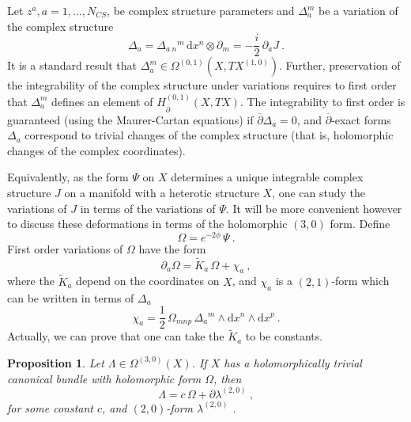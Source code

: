 \documentclass[12pt,a4paper]{article}
\newcommand{\half}{\frac{1}{2}}
\def\bar#1{\overline{#1}}
\let\p=\partial
\def\d{\textrm{d}}
\def\bp{\bar{\partial}}
\newtheorem{Proposition}{Proposition}
\theoremstyle{definition}
\begin{document}
Let $z^a, a = 1,\ldots, N_{CS}$, be complex structure parameters and $\Delta_a^m$ be a variation of the complex structure
\[ \Delta_a  = \Delta_a{}_{\, n}{}^m\, \d x^n\otimes \partial_m = - \frac{i}{2}\, \partial_aJ~.\]
It is a standard result that $\Delta_a^m\in \Omega^{(0,1)}(X, TX^{(1,0)})$. 
Further, preservation of the integrability of the complex structure under variations requires to first order that $\Delta_a^m$ defines an element of $H^{(0,1)}_{\bar\partial}(X,TX)$.  The integrability to first order is guaranteed (using the Maurer-Cartan equations) if $\bp\Delta_a = 0$, and $\bp$-exact forms $\Delta_a$ correspond to trivial changes of the complex structure (that is, holomorphic changes of the complex coordinates). 

Equivalently, as the form $\Psi$ on $X$ determines a unique integrable complex structure $J$ on a manifold with a heterotic structure $X$, one can study the  variations of $J$ in terms of the variations of $\Psi$. It will be more convenient however to discuss these deformations in terms of the holomorphic $(3,0)$ form.  Define
\[ \Omega = e^{-2\phi}\, \Psi~.\]
First order variations of $\Omega$ have the form~\citep{MR0112154, 0128.16902} 
\begin{equation} 
\partial_a \Omega = \widetilde K_a\, \Omega + \chi_a~,\label{eq:prevarO}
\end{equation}
where the $\widetilde K_a$ depend on the coordinates on $X$, and $\chi_a$ is a $(2,1)$-form which can be written in terms of $\Delta_a$
\begin{equation}
\chi_a = \half\, \Omega_{mnp}\, \Delta_a{}^m\wedge\d x^n\wedge\d x^p~.\label{eq:chi}
\end{equation}
Actually, we can prove that one can take the $\widetilde K_a$ to be  constants.

\begin{Proposition}\label{prop:30forms}
Let $\Lambda\in\Omega^{(3,0)}(X)$.  If $X$ has a holomorphically trivial canonical bundle with holomorphic form
$\Omega$, then
\[\Lambda = c\, \Omega + \p\lambda^{(2,0)}~,\]
for some constant $c$, and $(2,0)$-form $\lambda^{(2,0)}$ .
\end{Proposition}
\end{document}
